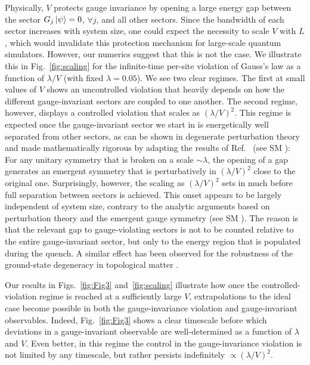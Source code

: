 \documentclass[aps,prl,reprint,twocolumn,superscriptaddress,floatfix,nofootinbib]{revtex4-1}
\begin{document}
	
	Physically, $V$ protects gauge invariance by opening a large energy gap between the sector $G_j\ket{\psi}=0$, $\forall j$, and all other sectors. Since the bandwidth of each sector increases with system size, one could expect the necessity to scale $V$ with $L$, which would invalidate this protection mechanism for large-scale quantum simulators. 
	However, our numerics suggest that this is not the case. We illustrate this in Fig.~\ref{fig:scaling} for the infinite-time per-site violation of Gauss's law as a function of $\lambda/V$ (with fixed $\lambda=0.05$). 
	We see two clear regimes. 
	The first at small values of $V$ shows an uncontrolled violation that heavily depends on how the different gauge-invariant sectors are coupled to one another. 
	The second regime, however, displays a controlled violation that scales as $(\lambda/V)^2$. 
	This regime is expected once the gauge-invariant sector we start in is energetically well separated from other sectors, as can be shown in degenerate perturbation theory and made mathematically rigorous by adapting the results of Ref.~\cite{Chubb2017} (see SM \cite{SM2}): 
	For any unitary symmetry that is broken on a scale $\sim\lambda$, the opening of a gap generates an emergent symmetry that is perturbatively in $(\lambda/V)^2$ close to the original one.  
	Surprisingly, however, the scaling as $(\lambda/V)^2$ sets in much before full separation between sectors is achieved. 
	This onset appears to be largely independent of system size, contrary to the analytic arguments based on perturbation theory and the emergent gauge symmetry (see SM \cite{SM2}). 
	The reason is that the relevant gap to gauge-violating sectors is not to be counted relative to the entire gauge-invariant sector, but only to the energy region that is populated during the quench. 
	A similar effect has been observed for the robustness of the ground-state degeneracy in topological matter \cite{Hastings2005}.
	
	Our results in Figs.~\ref{fig:Fig3} and~\ref{fig:scaling} illustrate how once the controlled-violation regime is reached at a sufficiently large $V$, extrapolations to the ideal case become possible in both the gauge-invariance violation and gauge-invariant observables. Indeed, Fig.~\ref{fig:Fig3} shows a clear timescale before which deviations in a gauge-invariant observable are well-determined as a function of $\lambda$ and $V$. Even better, in this regime the control in the gauge-invariance violation is not limited by any timescale, but rather persists indefinitely $\propto (\lambda/V)^2$.
	
\end{document}
